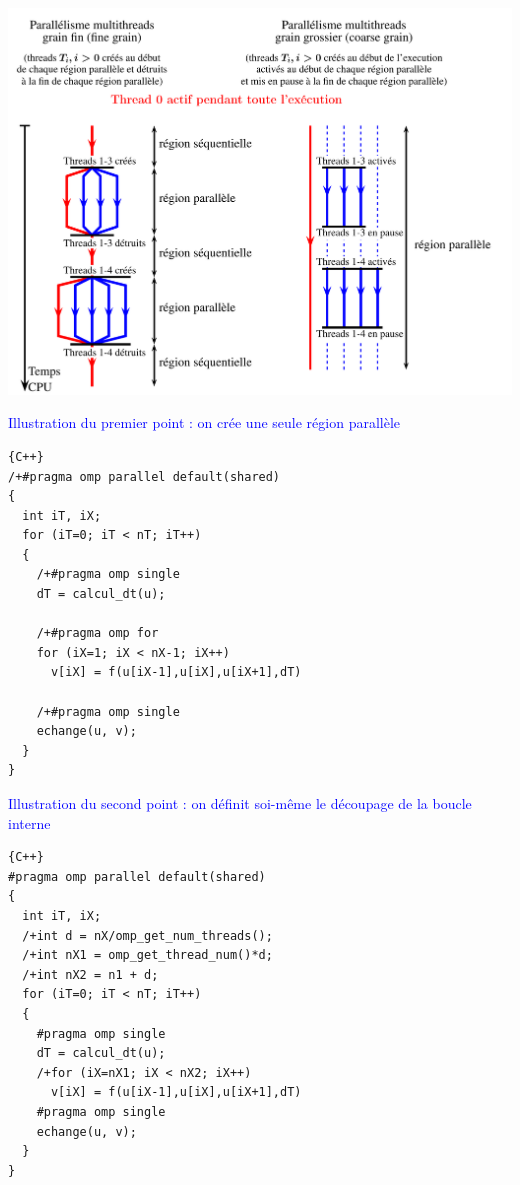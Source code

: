 \documentclass{beamer}
\begin{document}
\begin{frame}
	\includegraphics[scale=0.40]{../../Images/enchainement_coarse}
\end{frame}

\begin{frame}[fragile]
	\textcolor{blue}{Illustration du premier point : on crée une seule région parallèle}
	
	
	\begin{lstlisting}{C++}
/+#pragma omp parallel default(shared)
{
  int iT, iX;
  for (iT=0; iT < nT; iT++)
  {
    /+#pragma omp single
    dT = calcul_dt(u);
    
    /+#pragma omp for
    for (iX=1; iX < nX-1; iX++)
      v[iX] = f(u[iX-1],u[iX],u[iX+1],dT)

    /+#pragma omp single
    echange(u, v);
  }
}
\end{lstlisting}
	
\vfill
\end{frame}

\begin{frame}[fragile]
	\textcolor{blue}{Illustration du second point : on définit soi-même le découpage de la boucle interne}
	
	
	\begin{lstlisting}{C++}
#pragma omp parallel default(shared)
{
  int iT, iX;
  /+int d = nX/omp_get_num_threads();
  /+int nX1 = omp_get_thread_num()*d;
  /+int nX2 = n1 + d;
  for (iT=0; iT < nT; iT++)
  {
    #pragma omp single
    dT = calcul_dt(u);
    /+for (iX=nX1; iX < nX2; iX++)
      v[iX] = f(u[iX-1],u[iX],u[iX+1],dT)
    #pragma omp single
    echange(u, v);
  }
}
	\end{lstlisting}
	
	\vfill
\end{frame}
\end{document}
